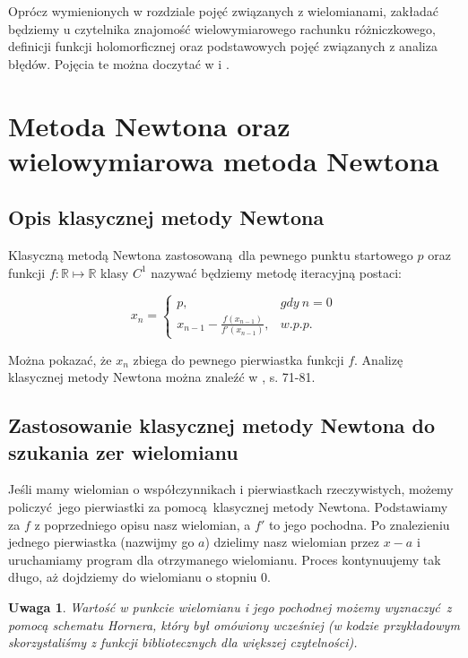 \documentclass{article}
\newtheorem{remark}{Uwaga}
\begin{document}
Oprócz wymienionych w rozdziale pojęć związanych z wielomianami, zakładać będziemy u czytelnika znajomość wielowymiarowego rachunku różniczkowego, definicji funkcji holomorficznej oraz podstawowych pojęć związanych z analiza błędów. Pojęcia te można doczytać w \cite{leja} i \cite{kincaid}. 

\section{Metoda Newtona oraz wielowymiarowa metoda Newtona}

\subsection{Opis klasycznej metody Newtona}

Klasyczną metodą Newtona zastosowaną dla pewnego punktu startowego $p$ oraz funkcji $f : \mathbb{R} \mapsto \mathbb{R}$ klasy $C^{1}$ nazywać będziemy metodę iteracyjną postaci:

$$
x_n = \left\{\begin{matrix}
p, & gdy \ n = 0\\ 
x_{n-1} - \frac{f(x_{n-1})}{f'(x_{n-1})}, & w.p.p. 
\end{matrix}\right.
$$

Można pokazać, że $x_n$ zbiega do pewnego pierwiastka funkcji $f$. Analizę klasycznej metody Newtona można znaleźć w \cite{kincaid}, s.   71-81.

\subsection{Zastosowanie klasycznej metody Newtona do szukania zer wielomianu}

Jeśli mamy wielomian o współczynnikach i pierwiastkach rzeczywistych, możemy policzyć jego pierwiastki za pomocą klasycznej metody Newtona. Podstawiamy za $f$ z poprzedniego opisu nasz wielomian, a $f'$ to jego pochodna. Po znalezieniu jednego pierwiastka (nazwijmy go $a$) dzielimy nasz wielomian przez $x-a$ i uruchamiamy program dla otrzymanego wielomianu. Proces kontynuujemy tak długo, aż dojdziemy do wielomianu o stopniu $0$.

\begin{remark}
Wartość w punkcie wielomianu i jego pochodnej możemy wyznaczyć z pomocą schematu Hornera, który był omówiony wcześniej (w kodzie przykładowym skorzystaliśmy z funkcji bibliotecznych dla większej czytelności).
\end{remark}
\end{document}
